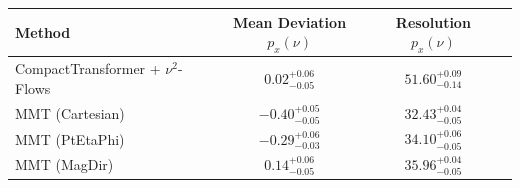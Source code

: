     \begin{tabular}{lccc}
        \toprule
        Method & Mean Deviation $p_{x}(\nu)$ & Resolution $p_{x}(\nu)$ \\
        \midrule
        CompactTransformer + $\nu^2$-Flows & $0.02^{+0.06}_{-0.05}$ & $51.60^{+0.09}_{-0.14}$ \\
        MMT (Cartesian) & $-0.40^{+0.05}_{-0.05}$ & $32.43^{+0.04}_{-0.05}$ \\
        MMT (PtEtaPhi) & $-0.29^{+0.06}_{-0.03}$ & $34.10^{+0.06}_{-0.05}$ \\
        MMT (MagDir) & $0.14^{+0.06}_{-0.05}$ & $35.96^{+0.04}_{-0.05}$ \\
        \bottomrule
    \end{tabular}